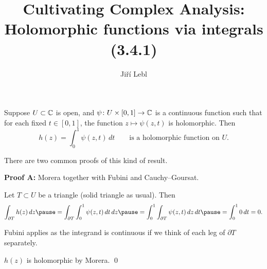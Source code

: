 \documentclass[10pt,aspectratio=169]{beamer}
\author{Ji\v{r}\'i Lebl}
\institute[OSU]{%
Departemento pri Matematiko de Oklahoma {\^S}tata Universitato}
\title{Cultivating Complex Analysis:\\%
Holomorphic functions via integrals (3.4.1)}
\date{}
\begin{document}
\begin{frame}
\titlepage
\end{frame}

\begin{frame}
\begin{lemma}
Suppose $U \subset {\mathbb{C}}$ is open, and
$\psi \colon U \times [0,1] \to {\mathbb{C}}$ is a continuous function such that
for each fixed $t \in [0,1]$, the function $z \mapsto \psi(z,t)$ is
holomorphic.  \pause Then
\[
h(z) =
\int_0^1 \psi(z,t) \, dt
\qquad
\text{is a holomorphic function on } U.
\]
\end{lemma}

\pause

There are two common proofs of this kind of result.

\medskip
\pause

\textbf{Proof A:}
Morera together with Fubini and Cauchy--Goursat.

\medskip
\pause

Let $T \subset U$ be a triangle (solid triangle as usual).  \pause Then
\[
\int_{\partial T}
h(z)
\, dz
\pause
=
\int_{\partial T}
\int_0^1 \psi(z,t) \, dt
\, dz
\pause
=
\int_0^1
\int_{\partial T}
\psi(z,t)
\, dz
\, dt
\pause
= \int_0^1 0 \, dt = 0.
\]
\pause

Fubini applies as the integrand is continuous
if we think of each leg of $\partial
T$ separately.

\pause
\medskip

$h(z)$ is holomorphic by Morera.
\qed
\end{frame}
\end{document}
